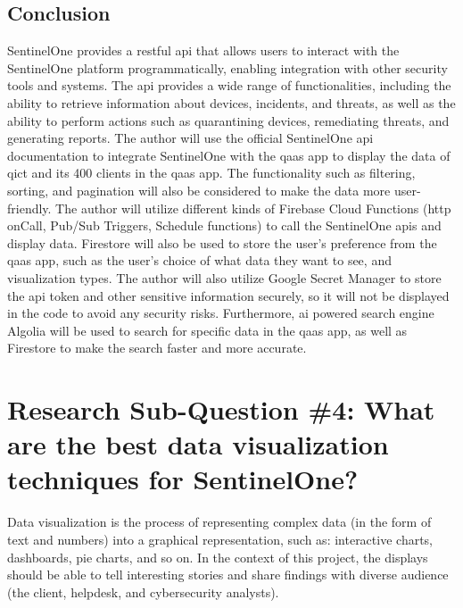 \subsection{Conclusion}
SentinelOne provides a \acrshort{rest}ful \acrshort{api} that allows users to interact with the SentinelOne platform
programmatically, enabling integration with other security tools and systems. The \acrshort{api} provides a wide range of
functionalities, including the ability to retrieve information about devices, incidents, and threats, as well as the ability
to perform actions such as quarantining devices, remediating threats, and generating reports. The author will use the official
SentinelOne \acrshort{api} documentation to integrate SentinelOne with the \acrshort{qaas} app to display the data of
\acrshort{qict} and its 400 clients in the \acrshort{qaas} app. The functionality such as filtering, sorting, and pagination
will also be considered to make the data more user-friendly. The author will utilize different kinds of Firebase Cloud
Functions (\acrshort{http} onCall, Pub/Sub Triggers, Schedule functions) to call the SentinelOne \acrshort{api}s and display
data. Firestore will also be used to store the user's preference from the \acrshort{qaas} app, such as the user's choice of
what data they want to see, and visualization types. The author will also utilize Google Secret Manager to store the
\acrshort{api} token and other sensitive information securely, so it will not be displayed in the code to avoid any security
risks. Furthermore, \acrshort{ai} powered search engine Algolia will be used to search for specific data in the \acrshort{qaas} app,
as well as Firestore to make the search faster and more accurate.

\section{Research Sub-Question \#4: What are the best data visualization techniques for SentinelOne?}
Data visualization is the process of representing complex data (in the form of text and numbers) into a
graphical representation, such as: interactive charts, dashboards, pie charts, and so on. In the context
of this project, the displays should be able to tell interesting stories and share findings with diverse
audience (the client, helpdesk, and cybersecurity analysts).

